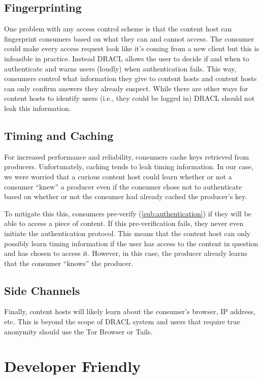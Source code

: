\documentclass[pdftex,12pt,a4papaer,twoside,notitlepage]{report}
\begin{document}
\subsection{Fingerprinting}
\label{sub:fingerprinting}

One problem with any access control scheme is that the content host can
fingerprint consumers based on what they can and cannot access. The consumer
could make every access request look like it's coming from a new client but this
is infeasible in practice. Instead DRACL allows the user to decide if and when
to authenticate and warns users (loudly) when authentication fails. This way,
consumers control what information they give to content hosts and content hosts
can only confirm answers they already suspect. While there are other ways for
content hosts to identify users (i.e., they could be logged in) DRACL should not
leak this information.

\subsection{Timing and Caching}

For increased performance and reliability, consumers cache keys retrieved from
producers. Unfortunately, caching tends to leak timing information. In our
case, we were worried that a curious content host could learn whether or not a
consumer ``knew'' a producer even if the consumer chose not to authenticate
based on whether or not the consumer had already cached the producer's key.

To mitigate this this, consumers pre-verify (\ref{sub:authentication}) if they
will be able to access a piece of content. If this pre-verification fails, they
never even initiate the authentication protocol. This means that the content
host can only possibly learn timing information if the user has access to the
content in question and has chosen to access it. However, in this case, the
producer already learns that the consumer ``knows'' the producer.

\subsection{Side Channels}

Finally, content hosts will likely learn about the consumer's browser, IP
address, etc. This is beyond the scope of DRACL system and users that require
true anonymity should use the Tor Browser\cite{tor} or Tails\cite{tails}.

\section{Developer Friendly}
\end{document}
